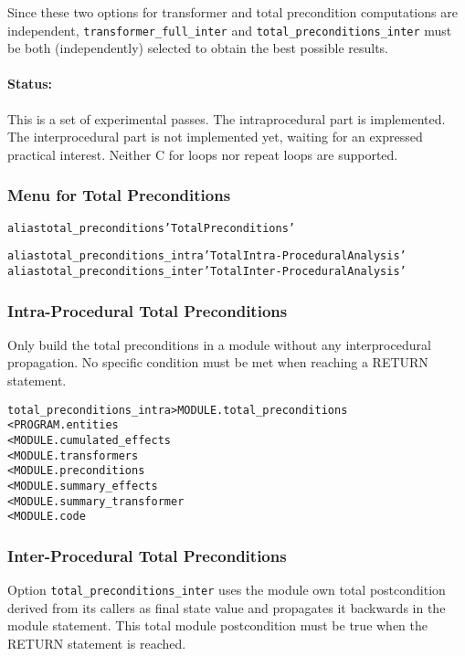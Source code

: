 \documentclass[a4paper]{report}
\newenvironment{PipsMake}{\begin{alltt}}{\end{alltt}}
\begin{document}
Since these two options for transformer and total precondition computations are
independent, \verb/transformer_full_inter/ and
\verb/total_preconditions_inter/ must be both (independently) selected
to obtain the best possible results.

\paragraph{Status:}
This is a set of experimental passes. The intraprocedural part is
implemented. The interprocedural part is not implemented yet, waiting
for an expressed practical interest. Neither C for loops nor repeat
loops are supported.

\subsubsection{Menu for Total Preconditions}

\begin{PipsMake}
alias total_preconditions 'Total Preconditions'

alias total_preconditions_intra 'Total Intra-Procedural Analysis'
alias total_preconditions_inter 'Total Inter-Procedural Analysis'
\end{PipsMake}

\subsubsection{Intra-Procedural Total Preconditions}

Only build the total preconditions in a module without any interprocedural
propagation. No specific condition must be met when reaching a RETURN statement.

\begin{PipsMake}
total_preconditions_intra            > MODULE.total_preconditions
        < PROGRAM.entities
        < MODULE.cumulated_effects
        < MODULE.transformers
        < MODULE.preconditions
        < MODULE.summary_effects
        < MODULE.summary_transformer
        < MODULE.code
\end{PipsMake}

\subsubsection{Inter-Procedural Total Preconditions}

Option \verb+total_preconditions_inter+ uses the module own total postcondition
derived from its callers as final state value and propagates it
backwards in the module statement. This total module postcondition must be
true when the RETURN statement is reached.
\end{document}
